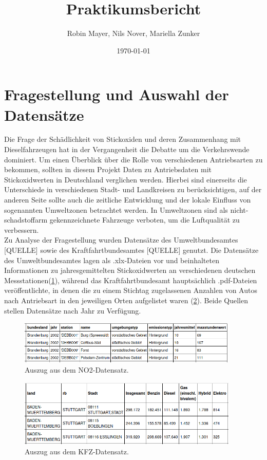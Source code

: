 \documentclass[11pt,a4paper,oneside,german]{article}
\title{Praktikumsbericht}
\author{Robin Mayer, Nils Nover, Mariella Zunker}
\date{\today}
\begin{document}
\maketitle

\newpage

\tableofcontents

\section{Fragestellung und Auswahl der Datensätze}

Die Frage der Schädlichkeit von Stickoxiden und deren Zusammenhang mit Dieselfahrzeugen hat in der Vergangenheit die Debatte um die Verkehrswende dominiert. Um einen Überblick über die Rolle von verschiedenen Antriebsarten zu bekommen, sollten in diesem Projekt Daten zu Antriebsdaten mit Stickoxidwerten in Deutschland verglichen werden. Hierbei sind einerseits die Unterschiede in verschiedenen Stadt- und Landkreisen zu berücksichtigen, auf der anderen Seite sollte auch die zeitliche Entwicklung und der lokale Einfluss von sogenannten Umweltzonen betrachtet werden. In Umweltzonen sind als nicht-schadstoffarm gekennzeichnete Fahrzeuge verboten, um die Luftqualität zu verbessern. \\
Zu Analyse der Fragestellung wurden Datensätze des Umweltbundesamtes [QUELLE] sowie des Kraftfahrtbundesamtes [QUELLE] genutzt. Die Datensätze des Umweltbundesamtes lagen als .xlx-Dateien vor und beinhalteten Informationen zu jahresgemittelten Stickoxidwerten an verschiedenen deutschen Messstationen(\ref{fig:BeispielNO2}), während das Kraftfahrtbundesamt hauptsächlich .pdf-Dateien veröffentlichte, in denen die zu einem Stichtag zugelassenen Anzahlen von Autos nach Antriebsart in den jeweiligen Orten aufgelistet waren (\ref{fig:BeispielKFZ}). Beide Quellen stellen Datensätze nach Jahr zu Verfügung.

\begin{figure}[h]
	\centering
	\includegraphics[width=10.5cm]{BeispielNO2.png}
	\caption{Auszug aus dem NO2-Datensatz.}
	\label{fig:BeispielNO2}
\end{figure}

\begin{figure}[h]
	\centering
	\includegraphics[width=10.5cm]{BeispielKFZ.png}
	\caption{Auszug aus dem KFZ-Datensatz.}
	\label{fig:BeispielKFZ}
\end{figure}
\end{document}
